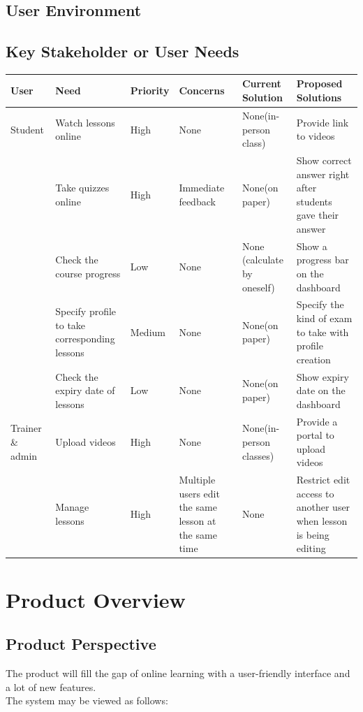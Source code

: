 \documentclass[a4paper]{article}
\begin{document}
\bigskip
\subsection{User Environment}



\bigskip
\subsection{Key Stakeholder or User Needs}
\begin{table}[!htb]
\begin{tabular}{|p{1.5cm}|p{3cm}|l|p{2cm}|p{2cm}|p{3.8cm}|}
\hline
User & Need & Priority & Concerns & Current Solution & Proposed Solutions \\ \hline
Student & Watch lessons online & High & None & None(in-person class) & Provide link to videos \\ \hline
 & Take quizzes online & High & Immediate feedback & None(on paper) & Show correct answer right after students gave their answer\\ \hline
 & Check the course progress & Low & None & None (calculate by oneself) & Show a progress bar on the dashboard\\ \hline
 & Specify profile to take corresponding lessons & Medium & None & None(on paper) & Specify the kind of exam to take with profile creation \\ \hline
 & Check the expiry date of lessons & Low & None & None(on paper) & Show expiry date on the dashboard \\ \hline
Trainer \& admin & Upload videos & High & None & None(in-person classes) & Provide a portal to upload videos\\ \hline
 & Manage lessons & High & Multiple users edit the same lesson at the same time & None & Restrict edit access to another user when lesson is being editing\\
\hline
\end{tabular}
\end{table}


\bigskip
\section{Product Overview}
\subsection{Product Perspective}
The product will fill the gap of online learning with a user-friendly interface and a lot of new features.\\ The system may be viewed as follows: \\
\end{document}
